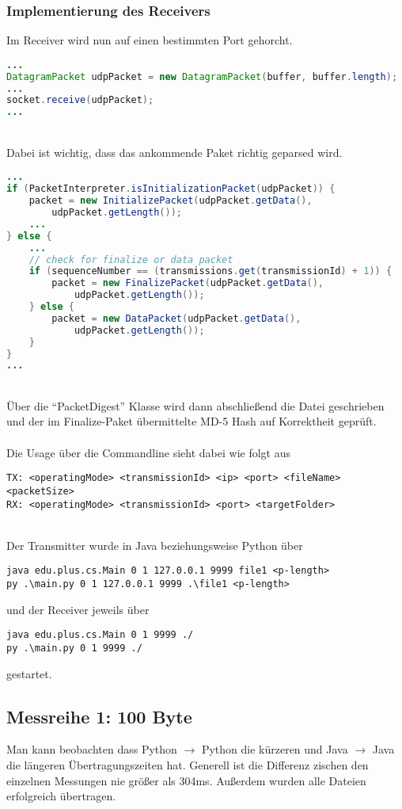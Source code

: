 \documentclass{article}
\begin{document}
    \subsubsection*{Implementierung des Receivers}
    Im Receiver wird nun auf einen bestimmten Port gehorcht.
    \begin{lstlisting}[language=Java]
...
DatagramPacket udpPacket = new DatagramPacket(buffer, buffer.length);
...
socket.receive(udpPacket);
...
    \end{lstlisting} \\
    Dabei ist wichtig, dass das ankommende Paket richtig geparsed wird.
    \begin{lstlisting}[language=Java]
...
if (PacketInterpreter.isInitializationPacket(udpPacket)) {
    packet = new InitializePacket(udpPacket.getData(),
        udpPacket.getLength());
    ...
} else {
    ...
    // check for finalize or data packet
    if (sequenceNumber == (transmissions.get(transmissionId) + 1)) {
        packet = new FinalizePacket(udpPacket.getData(),
            udpPacket.getLength());
    } else {
        packet = new DataPacket(udpPacket.getData(),
            udpPacket.getLength());
    }
}
...
    \end{lstlisting} \\
    Über die \enquote{PacketDigest} Klasse wird dann abschließend die Datei geschrieben und der im Finalize-Paket
    übermittelte MD-5 Hash auf Korrektheit geprüft.\\ \\
    Die Usage über die Commandline sieht dabei wie folgt aus
    \begin{lstlisting}
TX: <operatingMode> <transmissionId> <ip> <port> <fileName>
<packetSize>
RX: <operatingMode> <transmissionId> <port> <targetFolder>
    \end{lstlisting} \\
    Der Transmitter wurde in Java beziehungsweise Python über
    \begin{lstlisting}
java edu.plus.cs.Main 0 1 127.0.0.1 9999 file1 <p-length>
py .\main.py 0 1 127.0.0.1 9999 .\file1 <p-length>
    \end{lstlisting} und der Receiver jeweils über \\
    \begin{lstlisting}
java edu.plus.cs.Main 0 1 9999 ./
py .\main.py 0 1 9999 ./
    \end{lstlisting} gestartet.

    \subsection{Messreihe 1: 100 Byte}\label{subsec:messreihe-1:-100-byte}
    Man kann beobachten dass Python $\rightarrow$ Python die kürzeren und Java $\rightarrow$ Java die längeren Übertragungszeiten hat.
    Generell ist die Differenz zischen den einzelnen Messungen nie größer als 304ms.
    Außerdem wurden alle Dateien erfolgreich übertragen.
\end{document}
